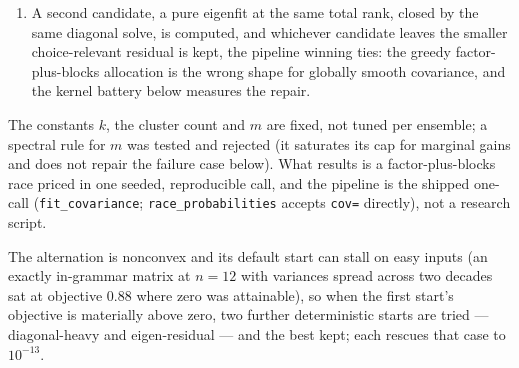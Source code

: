 \documentclass[11pt]{article}
\begin{document}
\begin{enumerate}
singular contrasts, and $\Sigma=\mathrm{diag}(10^{-8},10^{-8},1)$ makes
the failure vivid --- it forced $\mathrm{Var}(X_1-X_2)$ from
$2\times10^{-8}$ up to $6.7\times10^{-4}$, turning a near-certain
head-to-head into a coin flip (choice error $0.48$) while the projected
covariance residual sat one hundred times below the warning threshold. The Gram is exactly
$(1-\tfrac2n)I+\tfrac1{n^2}\mathbf{1}\mathbf{1}^{\top}$, so the
constrained solve is closed form in $O(n)$: substituting $d=\ell+x$
componentwise with $x\ge0$, writing $\ell$ for the vector of
per-runner floors, leaves the same Gram with a shifted right-hand side,
and the KKT conditions make the active set a threshold set, solved by
water-filling. It is the constrained minimizer, not an
unconstrained solve with a floor applied afterwards, which the Gram's
off-diagonal coupling would leave suboptimal. At $n=2$ the Gram is rank
one, only $d_1+d_2$ is identified, and the symmetric representative is
returned.
\item A second candidate, a pure eigenfit at the same total rank, closed by the same
diagonal solve, is computed, and whichever candidate leaves the
smaller choice-relevant residual is kept, the pipeline winning ties:
the greedy factor-plus-blocks allocation is the wrong shape for
globally smooth covariance, and the kernel battery below measures the repair.
\end{enumerate}

The constants $k$, the cluster count and $m$ are
fixed, not tuned per ensemble; a spectral rule for $m$ was tested and
rejected (it saturates its cap for marginal gains and does not repair the
failure case below). What results is a factor-plus-blocks race priced in
one seeded, reproducible call, and the pipeline
is the shipped one-call
(\texttt{fit\_covariance}; \texttt{race\_probabilities} accepts
\texttt{cov=} directly), not a research script.

The alternation
is nonconvex and its default start can stall on easy inputs (an exactly
in-grammar matrix at $n=12$ with variances spread across two decades sat
at objective $0.88$ where zero was attainable), so when the first
start's objective is materially above zero, two further deterministic
starts are tried --- diagonal-heavy and eigen-residual --- and the best
kept; each rescues that case to $10^{-13}$.
\end{document}
